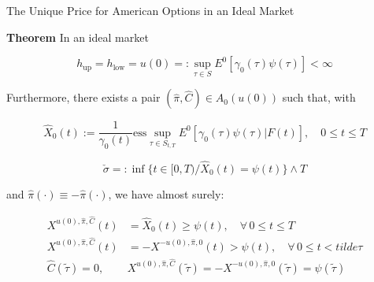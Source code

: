 \documentclass{beamer}
\begin{document}
\begin{frame}{The Unique Price for American Options in an Ideal Market}

    {\footnotesize \footnotesize
     \textbf{Theorem}  In an ideal market

    \[
    h_{\text{up}} = h_{\text{low}} = u(0) =: \sup_{\tau \in S} E^0[\gamma_0(\tau)\psi(\tau)] < \infty
    \]

    Furthermore, there exists a pair \((\hat{\pi}, \hat{C}) \in A_0(u(0))\) such that, with

    \[
    \hat{X}_0(t) := \frac{1}{\gamma_0(t)} \text{ess}\sup_{\tau \in S_{t,T}} 
    E^0[\gamma_0(\tau)\psi(\tau)|F(t)], \quad 0 \leq t \leq T
    \]

    \[
    \check{\sigma} =: \inf\{t \in [0, T)/\hat{X}_0(t) = \psi(t)\} \land T
    \]

    and \(\hat{\pi}(\cdot) \equiv -\hat{\pi}(\cdot)\), we have almost surely:

    \begin{align*}
    X^{u(0), \hat{\pi}, \hat{C}}(t) &= \hat{X}_0(t) \geq \psi(t), \quad \forall \, 0 \leq t \leq T \\
    X^{u(0), \hat{\pi}, \hat{C}}(t) &= -X^{-u(0), \hat{\pi}, 0}(t) > \psi(t), \quad \forall \, 0 \leq t < tilde{\tau}\\
    \hat{C}(\tilde{\tau}) = 0, \quad &X^{u(0), \hat{\pi}, \hat{C}}(\tilde{\tau}) = -X^{-u(0), \hat{\pi}, 0}(\tilde{\tau}) = \psi(\tilde{\tau})
    \end{align*}
    }
\end{frame} 



    
\end{document}
